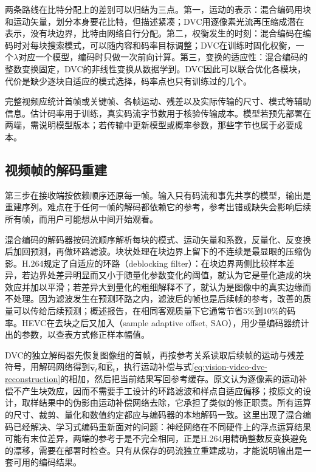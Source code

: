 两条路线在比特分配上的差别可以归结为三点。第一，运动的表示：混合编码用块和运动矢量，划分本身要花比特，但描述紧凑；DVC用逐像素光流再压缩成潜在表示，没有块边界，比特由网络自行分配。第二，权衡发生的时刻：混合编码在编码时对每块搜索模式，可以随内容和码率目标调整；DVC在训练时固化权衡，一个$\lambda$对应一个模型，编码时只做一次前向计算。第三，变换的适应性：混合编码的整数变换固定，DVC的非线性变换从数据学到。DVC因此可以联合优化各模块，代价是缺少逐块自适应的模式选择，码率点也只有训练过的几个。

完整视频应统计首帧或关键帧、各帧运动、残差以及实际传输的尺寸、模式等辅助信息。估计码率用于训练，真实码流字节数用于核验传输成本。模型若预先部署在两端，需说明模型版本；若传输中更新模型或概率参数，那些字节也属于必要成本。

\subsection{视频帧的解码重建}
\label{sec:vision-video-decoding}

第三步在接收端按依赖顺序还原每一帧。输入只有码流和事先共享的模型，输出是重建序列。难点在于任何一帧的解码都依赖它的参考，参考出错或缺失会影响后续所有帧，而用户可能想从中间开始观看。

混合编码的解码器按码流顺序解析每块的模式、运动矢量和系数，反量化、反变换后加回预测，再做环路滤波。块状处理在块边界上留下的不连续是最显眼的压缩伪影。H.264规定了自适应的环路（deblocking filter）：在块边界两侧比较样本差异，若边界处差异明显而又小于随量化参数变化的阈值，就认为它是量化造成的块效应并加以平滑；若差异大到量化的粗细解释不了，就认为是图像中的真实边缘而不处理。因为滤波发生在预测环路之内，滤波后的帧也是后续帧的参考，改善的质量可以传给后续预测；概述报告，在相同客观质量下它通常节省5\%到10\%的码率。HEVC在去块之后又加入（sample adaptive offset, SAO），用少量编码器统计出的参数，以查表方式修正样本幅值。

DVC的独立解码器先恢复图像组的首帧，再按参考关系读取后续帧的运动与残差符号，用解码网络得到$\widehat{\bm{v}}_t$和$\widehat{\bm{E}}_t$，执行运动补偿与式\eqref{eq:vision-video-dvc-reconstruction}的相加，然后把当前结果写回参考缓存。原文认为逐像素的运动补偿不产生块效应，因而不需要手工设计的环路滤波和样点自适应偏移；按原文的设计，取样结果中的伪影由运动补偿网络去除，它承担了类似的修正职责。所有运算的尺寸、裁剪、量化和数值约定都应与编码器的本地解码一致。这里出现了混合编码已经解决、学习式编码重新面对的问题：神经网络在不同硬件上的浮点运算结果可能有末位差异，两端的参考于是不完全相同，正是H.264用精确整数反变换避免的漂移，需要在部署时检查。只有从保存的码流独立重建成功，才能说明输出是一套可用的编码结果。

